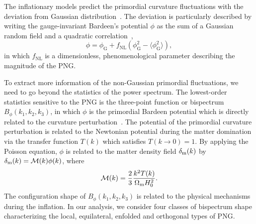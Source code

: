 \documentclass[twocolumn,floatfix,nofootinbib,aps,reprint]{revtex4}
\begin{document}

The inflationary models predict the primordial 
curvature fluctuations with the deviation from 
Gaussian distribution~\cite{1987PhLB..197...66A,1994ApJ...430..447G,2003JHEP...05..013M,2015CRPhy..16..969R}. 
The deviation is particularly described by writing the gauge-invariant
Bardeen's potential $\phi$ as the sum of a Gaussian random field 
and a quadratic correlation~\cite{1994ApJ...430..447G,2001PhRvD..63f3002K},
\begin{equation}
    \phi = \phi_\mathrm{G} + f_\mathrm{NL}(\phi_\mathrm{G}^2 - 
    \langle \phi_\mathrm{G}^2 \rangle),
\end{equation}
in which $f_\mathrm{NL}$ is a dimensionless, phenomenological parameter
describing the magnitude of the PNG.

To extract more information of the non-Gaussian primordial
fluctuations, we need to go beyond the statistics of the power spectrum.
The lowest-order statistics sensitive to 
the PNG is the three-point function or
bispectrum $B_\phi(k_1, k_2, k_3)$, in which $\phi$ is the 
primordial Bardeen potential which is directly related to the curvature 
perturbation~\cite{1980PhRvD..22.1882B}. 
The potential of the primordial curvature perturbation 
is related to the Newtonian potential during the matter domination 
via the transfer function $T(k)$ which satisfies $T(k\rightarrow0)=1$.
By applying the Poisson equation, $\phi$ is related to the matter
density field $\delta_{\rm m}(k)$ by $\delta_{\rm m}(k) = \mathcal{M}(k)\phi(k)$,
where
\begin{equation}\label{eq:m}
    \mathcal{M}(k) = \frac{2}{3}\frac{k^2T(k)}{\Omega_{\rm m}H_0^2}.
\end{equation}
The configuration shape of $B_\phi(k_1, k_2, k_3)$ is related to 
the physical mechanisms during the inflation. In our analysis,
we consider four classes of bispectrum shape characterizing
the local, equilateral, enfolded and orthogonal types of PNG.
\end{document}
